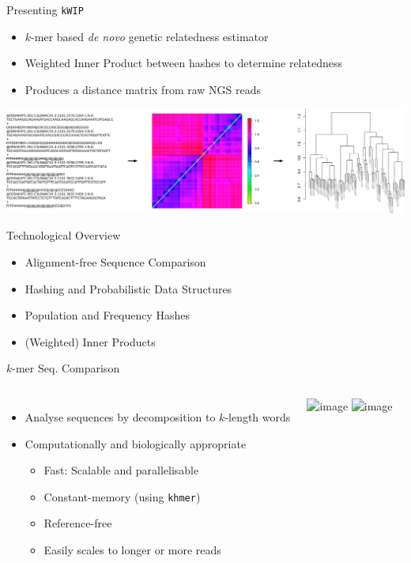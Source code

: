 \documentclass[t]{beamer}
\begin{document}
\begin{frame}{Presenting \texttt{kWIP}}
  \begin{itemize}
    \item $k$-mer based \textit{de novo} genetic relatedness estimator
    \item Weighted Inner Product between hashes to determine relatedness
    \item Produces a distance matrix from raw NGS reads
  \end{itemize}
  \begin{center}
    \includegraphics[width=\textwidth]{img/kwip-overview.png}
  \end{center}
\end{frame}

\begin{frame}{Technological Overview}
  \begin{itemize}
    \item Alignment-free Sequence Comparison
    \item Hashing and Probabilistic Data Structures
    \item Population and Frequency Hashes
    \item (Weighted) Inner Products
  \end{itemize}
\end{frame}

\begin{frame}{$k$-mer Seq. Comparison}
  \begin{columns}[t]
      \begin{itemize}
        \item<1-> Analyse sequences by decomposition to $k$-length words
        \item<1-> Computationally and biologically appropriate
        \begin{itemize}
          \item<1-> Fast: Scalable and parallelisable
          \item<1-> Constant-memory (using \texttt{khmer})
          \item<1-> Reference-free
          \item<1-> Easily scales to longer or more reads
        \end{itemize}
      \end{itemize}
    \begin{center}
      \includegraphics<1>[height=0.6\textheight]{img/ali.png}
      \includegraphics<2>[height=0.6\textheight]{img/ali-free.png}
    \end{center}
  \end{columns}
\end{frame}
\end{document}
